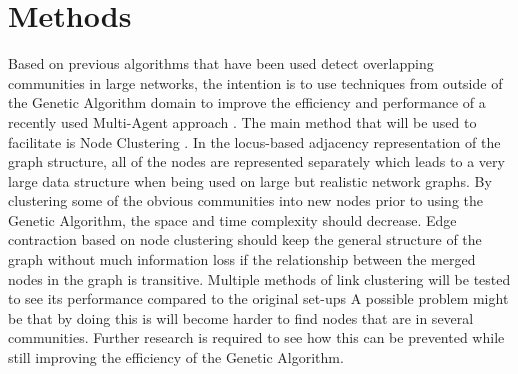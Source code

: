 \documentclass[twoside,twocolumn]{article}
\begin{document}

\section{Methods}
Based on previous algorithms that have been used detect overlapping communities in large networks, the intention is to use techniques from outside of the Genetic Algorithm domain to improve the efficiency and performance of a recently used Multi-Agent approach \cite{multiagent2016}.
The main method that will be used to facilitate is Node Clustering \cite{Ding2016}.
In the locus-based adjacency representation of the graph structure, all of the nodes are represented separately which leads to a very large data structure when being used on large but realistic network graphs.
By clustering some of the obvious communities into new nodes prior to using the Genetic Algorithm, the space and time complexity should decrease.
Edge contraction based on node clustering should keep the general structure of the graph without much information loss if the relationship between the merged nodes in the graph is transitive.
Multiple methods of link clustering will be tested to see its performance compared to the original set-ups
A possible problem might be that by doing this is will become harder to find nodes that are in several communities.
Further research is required to see how this can be prevented while still improving the efficiency of the Genetic Algorithm.





\end{document}
